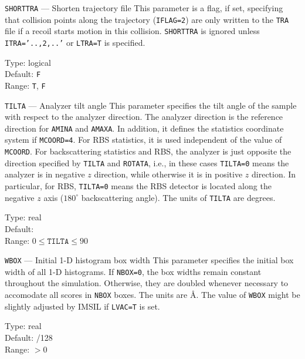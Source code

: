 \begin{keydescription}{\texttt{SHORTTRA} --- Shorten trajectory file}
%
  This parameter is a flag, if set, specifying that collision points
  along the trajectory (\texttt{IFLAG=2}) are only written to the \texttt{TRA}
  file if a recoil starts motion in this collision. \texttt{SHORTTRA} is ignored
  unless \texttt{ITRA='..,2,..'} or \texttt{LTRA=T} is specified.
  \begin{keytab}
    Type:    \> logical \\
    Default: \> \texttt{F} \\
    Range:   \> \texttt{T}, \texttt{F}
  \end{keytab}
\end{keydescription}

\begin{keydescription}{\texttt{TILTA} --- Analyzer tilt angle}
%
  This parameter specifies the tilt angle of the sample with respect to the
  analyzer direction. The analyzer direction is the reference direction for
  \texttt{AMINA} and \texttt{AMAXA}. In addition, it defines the statistics
  coordinate system if \texttt{MCOORD=4}. For RBS statistics, it is used
  independent of the value of \texttt{MCOORD}. For backscattering statistics and
  RBS, the analyzer is just opposite the direction specified by \texttt{TILTA}
  and \texttt{ROTATA}, i.e., in these cases \texttt{TILTA=0} means the analyzer
  is in negative $z$ direction, while otherwise it is in positive $z$ direction.
  In particular, for RBS, \texttt{TILTA=0} means the RBS detector is
  located along the negative $z$ axis ($180^\circ$ backscattering angle). The
  units of \texttt{TILTA} are degrees.
  \begin{keytab}
    Type:    \> real \\
    Default:  \\
    Range:   \> $0 \le \texttt{TILTA} \le 90$
  \end{keytab}
\end{keydescription}

\begin{keydescription}{\texttt{WBOX} --- Initial 1-D histogram box width}
%
  This parameter specifies the initial box width of all 1-D histograms. If
  \texttt{NBOX=0}, the box widths remain constant throughout the simulation.
  Otherwise, they are doubled whenever necessary to accomodate all scores in
  \texttt{NBOX} boxes. The units are \AA. The value of \texttt{WBOX} might be
  slightly adjusted by IMSIL if \texttt{LVAC=T} is set. 
  \begin{keytab}
    Type:    \> real \\
    Default: /128 \\
    Range:   \> $> 0$
  \end{keytab}
\end{keydescription}

